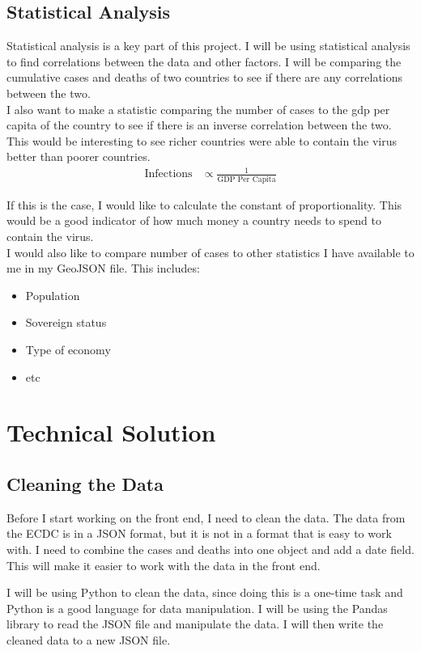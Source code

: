\documentclass{report}
\begin{document}
\section{Statistical Analysis}
Statistical analysis is a key part of this project. I will be using statistical analysis to find correlations between the data and other factors. I will be comparing the cumulative cases and deaths of two countries to see if there are any correlations between the two.\\

I also want to make a statistic comparing the number of cases to the gdp per capita of the country to see if there is an inverse correlation between the two. This would be interesting to see richer countries were able to contain the virus better than poorer countries.
\begin{align}
\text{Infections} &\propto \frac{1}{\text{GDP Per Capita}}
\end{align}

If this is the case, I would like to calculate the constant of proportionality. This would be a good indicator of how much money a country needs to spend to contain the virus. \\

I would also like to compare number of cases to other statistics I have available to me in my GeoJSON file. This includes:
\begin{itemize}
    \item Population
    \item Sovereign status
    \item Type of economy
    \item etc
\end{itemize}

\newpage
\chapter{Technical Solution}
\section{Cleaning the Data}
Before I start working on the front end, I need to clean the data. The data from the ECDC is in a JSON format, but it is not in a format that is easy to work with. I need to combine the cases and deaths into one object and add a date field. This will make it easier to work with the data in the front end.

I will be using Python to clean the data, since doing this is a one-time task and Python is a good language for data manipulation. I will be using the Pandas library to read the JSON file and manipulate the data. I will then write the cleaned data to a new JSON file.
\end{document}
